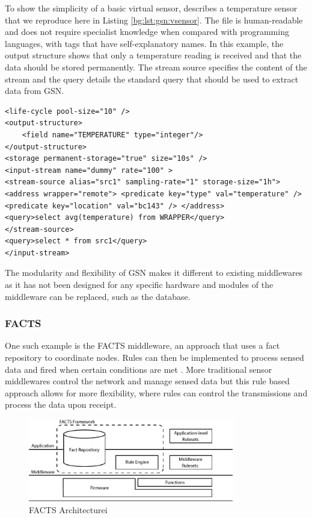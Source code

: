 To show the simplicity of a basic virtual sensor, \cite{Aberer2007} describes a temperature sensor that we reproduce here in Listing \ref{bg:lst:gsn:vsensor}. The file is human-readable and does not require specialist knowledge when compared with programming languages, with tags that have self-explanatory names. In this example, the output structure shows that only a temperature reading is received and that the data should be stored permanently. The stream source specifies the content of the stream and the query details the standard query that should be used to extract data from GSN.

\begin{lstlisting}[caption={Example Virtual Sensor},label={bg:lst:gsn:vsensor}]
<life-cycle pool-size="10" />
<output-structure> 
	<field name="TEMPERATURE" type="integer"/> 
</output-structure>
<storage permanent-storage="true" size="10s" /> 
<input-stream name="dummy" rate="100" > 
<stream-source alias="src1" sampling-rate="1" storage-size="1h">
<address wrapper="remote"> <predicate key="type" val="temperature" /> <predicate key="location" val="bc143" /> </address> 
<query>select avg(temperature) from WRAPPER</query>
</stream-source>
<query>select * from src1</query> 
</input-stream>

\end{lstlisting}

The modularity and flexibility of GSN makes it different to existing middlewares as it has not been designed for any specific hardware and modules of the middleware can be replaced, such as the database. 

	\subsubsection{FACTS}
		One such example is the FACTS middleware, an approach that uses a fact repository to coordinate nodes. Rules can then be implemented to process sensed data and fired when certain conditions are met \cite{Terfloth2006}. More traditional sensor middlewares control the network and manage sensed data but this rule based approach allows for more flexibility, where rules can control the transmissions and process the data upon receipt.

		\begin{figure}[h]
		\centering
		\includegraphics[width=0.8\textwidth]{Chap2/figures/facts_architecture.jpg}
		\caption{FACTS Architecturei \cite{Terfloth2006}}
		\label{bg:fig:facts}
		\end{figure}

